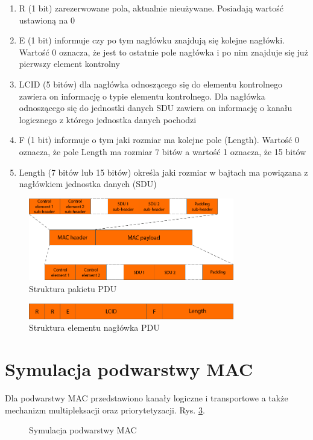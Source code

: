 \begin{enumerate}
	\item R (1 bit) zarezerwowane pola, aktualnie nieużywane. Posiadają wartość ustawioną na 0
	\item E (1 bit) informuje czy po tym nagłówku znajdują się kolejne nagłówki. Wartość 0 oznacza, że jest to ostatnie pole nagłówka i po nim znajduje się już pierwszy element kontrolny
	\item LCID (5 bitów) dla nagłówka odnoszącego się do elementu kontrolnego zawiera on informację o typie elementu kontrolnego. Dla nagłówka odnoszącego się do jednostki danych SDU zawiera on informację o kanału logicznego z którego jednostka danych pochodzi
	\item F (1 bit) informuje o tym jaki rozmiar ma kolejne pole (Length). Wartość 0 oznacza, że pole Length ma rozmiar 7 bitów a wartość 1 oznacza, że 15 bitów
	\item Length (7 bitów lub 15 bitów) określa jaki rozmiar w bajtach ma powiązana z nagłówkiem jednostka danych (SDU)
\end{enumerate}

\begin{figure}
	\centerline{\includegraphics[width=0.8\textwidth]{images/mac_pdu.png}}
	\caption{Struktura pakietu PDU}
	\label{fig:mac_pdu}
\end{figure}

\begin{figure}
	\centerline{\includegraphics[width=0.8\textwidth]{images/mac_pdu_subheader.png}}
	\caption{Struktura elementu nagłówka PDU}
	\label{fig:mac_pdu_subheader}
\end{figure}

\section{Symulacja podwarstwy MAC}

Dla podwarstwy MAC przedstawiono kanały logiczne i transportowe a także mechanizm multipleksacji oraz priorytetyzacji. Rys. \ref{fig:mac_simulation}.

\begin{figure}[ht]
	\centerline{}
	\caption{Symulacja podwarstwy MAC}
	\label{fig:mac_simulation}
\end{figure}

